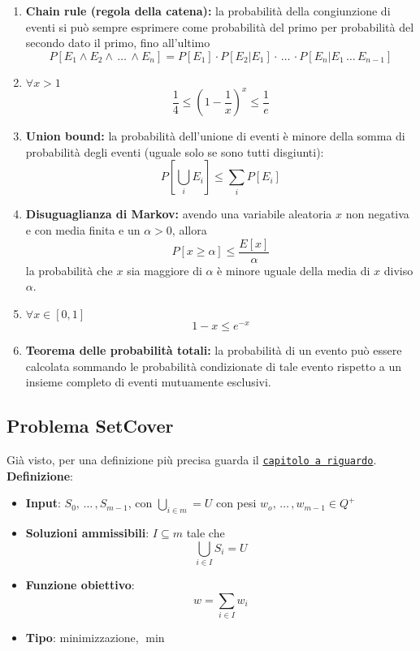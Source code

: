 \begin{enumerate}
	\item \textbf{Chain rule (regola della catena):} la probabilità della congiunzione di eventi si può sempre esprimere come probabilità del primo per probabilità del secondo dato il primo, fino all'ultimo
	$$ P[E_1 \wedge E_2 \wedge \, \dots \, \wedge E_n] = P [E_1] \cdot P [E_2 | E_1] \cdot \, \dots \, \cdot P[E_n | E_1 \, \dots \, E_{n-1}] $$
	
	\item $\forall x > 1$
	$$ \frac{1}{4} \leq \left(1 - \frac{1}{x}\right)^x \leq \frac{1}{e} $$
	
	\item \textbf{Union bound:} la probabilità dell'unione di eventi è minore della somma di probabilità degli eventi (uguale solo se sono tutti disgiunti):
	$$ P\left[ \bigcup_i E_i \right] \leq \sum_i P[E_i] $$
	
	\item \textbf{Disuguaglianza di Markov:} avendo una variabile aleatoria $x$ non negativa e con media finita e un $\alpha > 0$, allora
	$$ P[x \geq \alpha] \leq \frac{E[x]}{\alpha} $$
	la probabilità che $x$ sia maggiore di $\alpha$ è minore uguale della media di $x$ diviso $\alpha$.
	
	\item $\forall x \in [0,1]$
	$$ 1 - x \leq e^{-x} $$
	
	\item \textbf{Teorema delle probabilità totali:} la probabilità di un evento può essere calcolata sommando le probabilità condizionate di tale evento rispetto a un insieme completo di eventi mutuamente esclusivi.\\
\end{enumerate}

\newpage

\subsection{Problema SetCover}

Già visto, per una definizione più precisa guarda il \hyperref[subsec:setcover]{\texttt{capitolo a riguardo}}.\\

\textbf{Definizione}:
\begin{itemize}
	\item \textbf{Input}: $S_0, \, \dots \, , S_{m-1}$, con $\bigcup_{i \in m} = U$ con pesi $w_o, \, \dots \, , w_{m-1} \in Q^+$
	
	\item \textbf{Soluzioni ammissibili}: $I \subseteq m$ tale che
	$$ \bigcup_{i \in I} S_i = U $$
	
	\item \textbf{Funzione obiettivo}: 
	$$ w = \sum_{i \in I} w_i $$
	
	\item \textbf{Tipo}: minimizzazione, $\min$
\end{itemize} 

